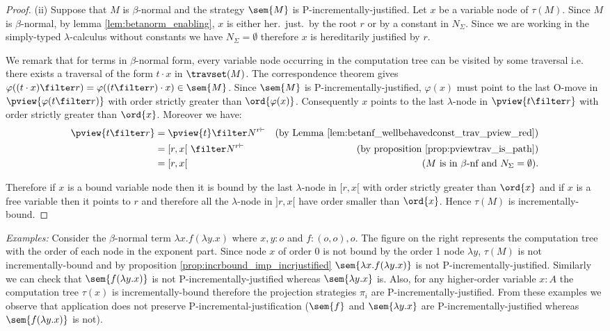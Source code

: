 \begin{proof}
\noindent (ii) Suppose that $M$ is $\beta$-normal and the strategy
$\sem{M}$ is P-incrementally-justified. Let $x$ be a variable node of
$\tau(M)$. Since $M$ is $\beta$-normal, by lemma
\ref{lem:betanorm_enabling}, $x$ is either her.\ just.\ by the root $r$ or by a constant in $N_\Sigma$. Since we are working in the simply-typed $\lambda$-calculus without constants we have $N_\Sigma = \emptyset$ therefore $x$ is
hereditarily justified by $r$.


We remark that for terms in $\beta$-normal form, every variable node
occurring in the computation tree can be visited by some traversal
i.e. there exists a traversal of the form $t \cdot x$ in
$\travset(M)$. The correspondence theorem gives $\varphi((t \cdot x)
\filter r) = \varphi((t \filter r) \cdot x) \in
\sem{M}$. Since $\sem{M}$ is P-incrementally-justified, $\varphi(x)$
must point to the last O-move in $\pview{\varphi(t \filter
r)}$ with order strictly greater than $\ord{\varphi(x)}$.
Consequently $x$ points to the last $\lambda$-node in $\pview{t
\filter r}$ with order strictly greater than $\ord{x}$. Moreover we
have:
\begin{align*}
\pview{t \filter r} &= \pview{t} \filter N^{r \vdash} & (\mbox{by Lemma \ref{lem:betanf_wellbehavedconst_trav_pview_red}}) \\
& = [r,x[\  \filter N^{r \vdash} & (\mbox{by proposition \ref{prop:pviewtrav_is_path}}) \\
& = [r,x[  & (\mbox{$M$ is in $\beta$-nf and $N_\Sigma = \emptyset$}).
\end{align*}


Therefore if $x$ is a bound variable node then it is bound by the
last $\lambda$-node in $[r,x[$ with order strictly greater than
$\ord{x}$ and if $x$ is a free variable then it points to $r$ and
therefore all the $\lambda$-node in $]r,x[$ have order smaller than
$\ord{x}$. Hence $\tau(M)$ is incrementally-bound.
\end{proof}



\noindent \emph{Examples:} Consider the $\beta$-normal term $\lambda
x . f (\lambda y .x)$ where $x,y:o$ and $f:(o,o),o$. The figure on
the right represents the computation tree with the order of each
node in the exponent part. Since node $x$ of order $0$ is not bound
by the order 1 node $\lambda y$, $\tau(M)$ is not
incrementally-bound and by proposition
\ref{prop:incrbound_imp_incrjustified} $\sem{\lambda x . f (\lambda
y .x)}$ is not P-incrementally-justified. Similarly we can check that
$\sem{f (\lambda y .x)}$ is not P-incrementally-justified
whereas $\sem{\lambda y. x}$ is.
Also, for any higher-order variable $x:A$ the computation tree
$\tau(x)$ is incrementally-bound therefore the projection
strategies $\pi_i$ are P-incrementally-justified. From these examples
we observe that application does not preserve
P-incremental-justification ($\sem{f}$ and $\sem{\lambda y. x}$ are
P-incrementally-justified whereas $\sem{f (\lambda y .x)}$ is not).

